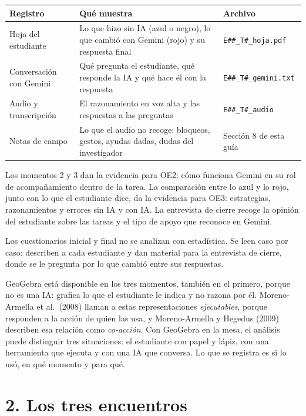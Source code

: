 \documentclass[11pt,letterpaper]{article}
\begin{document}
\begin{center}\small
\renewcommand{\arraystretch}{1.25}
\begin{tabularx}{\linewidth}{@{}p{3.6cm}Lp{3.4cm}@{}}
\toprule
\textbf{Registro} & \textbf{Qué muestra} & \textbf{Archivo} \\
\midrule
Hoja del estudiante & Lo que hizo sin IA (azul o negro), lo que cambió con Gemini (rojo) y su respuesta final & \texttt{E\#\#\_T\#\_hoja.pdf} \\
Conversación con Gemini & Qué pregunta el estudiante, qué responde la IA y qué hace él con la respuesta & \texttt{E\#\#\_T\#\_gemini.txt} \\
Audio y transcripción & El razonamiento en voz alta y las respuestas a las preguntas & \texttt{E\#\#\_T\#\_audio} \\
Notas de campo & Lo que el audio no recoge: bloqueos, gestos, ayudas dadas, dudas del investigador & Sección 8 de esta guía \\
\bottomrule
\end{tabularx}
\end{center}

Los momentos 2 y 3 dan la evidencia para OE2: cómo funciona Gemini en su rol de acompañamiento dentro de la tarea. La comparación entre lo azul y lo rojo, junto con lo que el estudiante dice, da la evidencia para OE3: estrategias, razonamientos y errores sin IA y con IA. La entrevista de cierre recoge la opinión del estudiante sobre las tareas y el tipo de apoyo que reconoce en Gemini.

Los cuestionarios inicial y final no se analizan con estadística. Se leen caso por caso: describen a cada estudiante y dan material para la entrevista de cierre, donde se le pregunta por lo que cambió entre sus respuestas.

GeoGebra está disponible en los tres momentos, también en el primero, porque no es una IA: grafica lo que el estudiante le indica y no razona por él. Moreno-Armella et al.\ (2008) llaman a estas representaciones \emph{ejecutables}, porque responden a la acción de quien las usa, y Moreno-Armella y Hegedus (2009) describen esa relación como \emph{co-acción}. Con GeoGebra en la mesa, el análisis puede distinguir tres situaciones: el estudiante con papel y lápiz, con una herramienta que ejecuta y con una IA que conversa. Lo que se registra es si lo usó, en qué momento y para qué.

\section*{2. Los tres encuentros}
\end{document}
